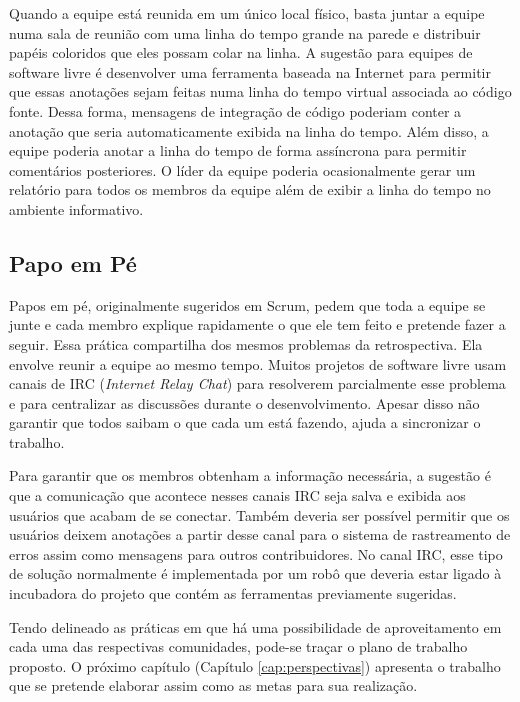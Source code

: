 Quando a equipe está reunida em um único local físico, basta juntar a
equipe numa sala de reunião com uma linha do tempo grande na parede e
distribuir papéis coloridos que eles possam colar na linha. A sugestão
para equipes de software livre é desenvolver uma ferramenta baseada na
Internet para permitir que essas anotações sejam feitas numa linha do
tempo virtual associada ao código fonte. Dessa forma, mensagens de
integração de código poderiam conter a anotação que seria
automaticamente exibida na linha do tempo. Além disso, a equipe
poderia anotar a linha do tempo de forma assíncrona para permitir
comentários posteriores. O líder da equipe poderia ocasionalmente
gerar um relatório para todos os membros da equipe além de exibir a
linha do tempo no ambiente informativo.

\subsection{Papo em Pé}
\label{subsec:stand-up}

Papos em pé, originalmente sugeridos em Scrum, pedem que toda a equipe
se junte e cada membro explique rapidamente o que ele tem feito e
pretende fazer a seguir. Essa prática compartilha dos mesmos problemas
da retrospectiva. Ela envolve reunir a equipe ao mesmo tempo. Muitos
projetos de software livre usam canais de IRC (\emph{Internet Relay
  Chat}) para resolverem parcialmente esse problema e para centralizar
as discussões durante o desenvolvimento. Apesar disso não garantir que
todos saibam o que cada um está fazendo, ajuda a sincronizar o
trabalho.

Para garantir que os membros obtenham a informação necessária, a
sugestão é que a comunicação que acontece nesses canais IRC seja salva
e exibida aos usuários que acabam de se conectar. Também deveria ser
possível permitir que os usuários deixem anotações a partir desse
canal para o sistema de rastreamento de erros assim como mensagens
para outros contribuidores. No canal IRC, esse tipo de solução
normalmente é implementada por um robô que deveria estar ligado à
incubadora do projeto que contém as ferramentas previamente sugeridas.

Tendo delineado as práticas em que há uma possibilidade de
aproveitamento em cada uma das respectivas comunidades, pode-se traçar
o plano de trabalho proposto. O próximo capítulo (Capítulo
\ref{cap:perspectivas}) apresenta o trabalho que se pretende elaborar
assim como as metas para sua realização.
